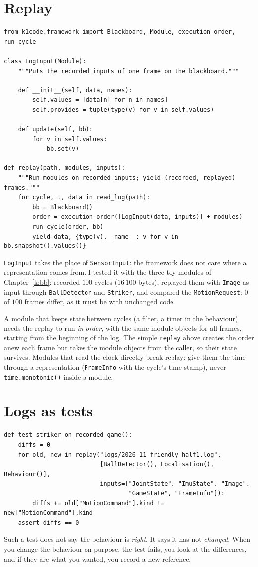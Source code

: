 \section*{Replay}
\begin{verbatim}
from k1code.framework import Blackboard, Module, execution_order, run_cycle

class LogInput(Module):
    """Puts the recorded inputs of one frame on the blackboard."""

    def __init__(self, data, names):
        self.values = [data[n] for n in names]
        self.provides = tuple(type(v) for v in self.values)

    def update(self, bb):
        for v in self.values:
            bb.set(v)

def replay(path, modules, inputs):
    """Run modules on recorded inputs; yield (recorded, replayed) frames."""
    for cycle, t, data in read_log(path):
        bb = Blackboard()
        order = execution_order([LogInput(data, inputs)] + modules)
        run_cycle(order, bb)
        yield data, {type(v).__name__: v for v in bb.snapshot().values()}
\end{verbatim}
\texttt{LogInput} takes the place of \texttt{SensorInput}: the framework does not care where a representation comes from. I tested it with the three toy modules of Chapter~\ref{k:bb}: recorded $100$ cycles ($16\,100$ bytes), replayed them with \texttt{Image} as input through \texttt{BallDetector} and \texttt{Striker}, and compared the \texttt{MotionRequest}: $0$ of $100$ frames differ, as it must be with unchanged code.

\begin{aibox}
A module that keeps state between cycles (a filter, a timer in the behaviour) needs the replay to run \emph{in order}, with the same module objects for all frames, starting from the beginning of the log. The simple \texttt{replay} above creates the order anew each frame but takes the module objects from the caller, so their state survives. Modules that read the clock directly break replay: give them the time through a representation (\texttt{FrameInfo} with the cycle's time stamp), never \verb!time.monotonic()! inside a module.
\end{aibox}

\section*{Logs as tests}
\begin{verbatim}
def test_striker_on_recorded_game():
    diffs = 0
    for old, new in replay("logs/2026-11-friendly-half1.log",
                           [BallDetector(), Localisation(), Behaviour()],
                           inputs=["JointState", "ImuState", "Image",
                                   "GameState", "FrameInfo"]):
        diffs += old["MotionCommand"].kind != new["MotionCommand"].kind
    assert diffs == 0
\end{verbatim}
Such a test does not say the behaviour is \emph{right}. It says it has not \emph{changed}. When you change the behaviour on purpose, the test fails, you look at the differences, and if they are what you wanted, you record a new reference.

